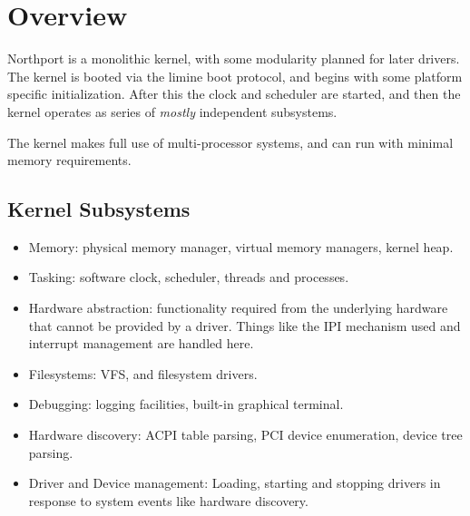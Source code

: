 \section{Overview}
Northport is a monolithic kernel, with some modularity planned for later drivers. The kernel is booted via the limine boot protocol, and begins with some platform specific initialization. After this the clock and scheduler are started, and then the kernel operates as series of \textit{mostly} independent subsystems.

The kernel makes full use of multi-processor systems, and can run with minimal memory requirements.

\subsection{Kernel Subsystems}
\begin{itemize}
    \item Memory: physical memory manager, virtual memory managers, kernel heap.
    \item Tasking: software clock, scheduler, threads and processes.
    \item Hardware abstraction: functionality required from the underlying hardware that cannot be provided by a driver. Things like the IPI mechanism used and interrupt management are handled here.
    \item Filesystems: VFS, and filesystem drivers.
    \item Debugging: logging facilities, built-in graphical terminal.
    \item Hardware discovery: ACPI table parsing, PCI device enumeration, device tree parsing.
    \item Driver and Device management: Loading, starting and stopping drivers in response to system events like hardware discovery.
\end{itemize}

